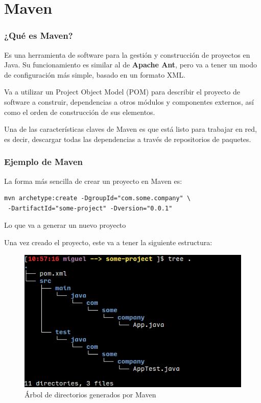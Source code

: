 \documentclass{beamer}
\begin{document}
\section{Maven}

\begin{frame}
  \frametitle{¿Qué es Maven?}
Es una herramienta de software para la gestión y construcción de
proyectos en Java. Su funcionamiento es similar al de \textbf{Apache
  Ant}, pero va a tener un modo de configuración más simple, basado en
un formato XML.

Va a utilizar un Project Object Model (POM) para describir el proyecto
de software a construir, dependencias a otros módulos y componentes
externos, así como el orden de construcción de sus elementos.

Una de las características claves de Maven es que está listo para
trabajar en red, es decir, descargar todas las dependencias a través
de repositorios de paquetes.
\end{frame}

\begin{frame}[fragile]
  \frametitle{Ejemplo de Maven}

La forma más sencilla de crear un proyecto en Maven es:
\begin{verbatim}
mvn archetype:create -DgroupId="com.some.company" \
 -DartifactId="some-project" -Dversion="0.0.1"
\end{verbatim}

Lo que va a generar un nuevo proyecto
\end{frame}

\begin{frame}[fragile]
  Una vez creado el proyecto, este va a tener la siguiente estructura:
  \begin{figure}[ht]
    \centering
    \includegraphics[scale=0.4]{figures/tree.png}
    \caption{\label{fig:tree} Árbol de directorios generados por Maven}
  \end{figure}

\end{frame}
\end{document}
